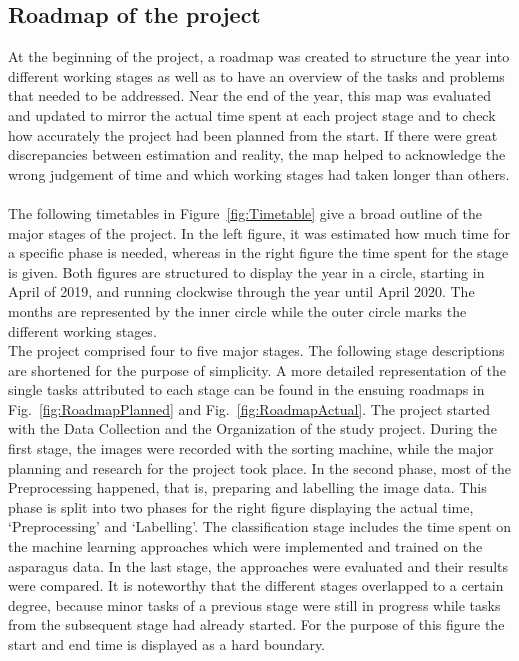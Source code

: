 \subsection{Roadmap of the project}

At the beginning of the project, a roadmap was created to structure the year into different working stages as well as to have an overview of the tasks and problems that needed to be addressed. Near the end of the year, this map was evaluated and updated to mirror the actual time spent at each project stage and to check how accurately the project had been planned from the start. If there were great discrepancies between estimation and reality, the map helped to acknowledge the wrong judgement of time and which working stages had taken longer than others. \\
\\
The following timetables in Figure~\ref{fig:Timetable} give a broad outline of the major stages of the project. In the left figure, it was estimated how much time for a specific phase is needed, whereas in the right figure the time spent for the stage is given. Both figures are structured to display the year in a circle, starting in April of 2019, and running clockwise through the year until April 2020. The months are represented by the inner circle while the outer circle marks the different working stages. \\
The project comprised four to five major stages. The following stage descriptions are shortened for the purpose of simplicity. A more detailed representation of the single tasks attributed to each stage can be found in the ensuing roadmaps in Fig.~\ref{fig:RoadmapPlanned} and Fig.~\ref{fig:RoadmapActual}. The project started with the Data Collection and the Organization of the study project. During the first stage, the images were recorded with the sorting machine, while the major planning and research for the project took place. In the second phase, most of the Preprocessing happened, that is, preparing and labelling the image data. This phase is split into two phases for the right figure displaying the actual time, ‘Preprocessing’ and ‘Labelling’. The classification stage includes the time spent on the machine learning approaches which were implemented and trained on the asparagus data. In the last stage, the approaches were evaluated and their results were compared. It is noteworthy that the different stages overlapped to a certain degree, because minor tasks of a previous stage were still in progress while tasks from the subsequent stage had already started. For the purpose of this figure the start and end time is displayed as a hard boundary. \\
\\


